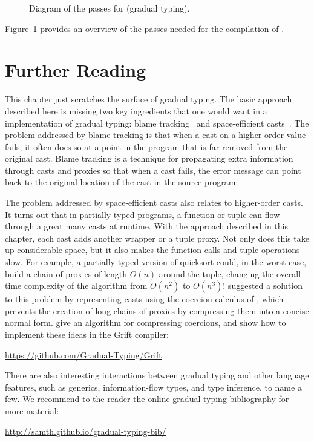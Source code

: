 \documentclass[7x10]{TimesAPriori_MIT}%
\numberwithin{theorem}{chapter}
\numberwithin{definition}{chapter}
\numberwithin{equation}{chapter}
\begin{document}
\begin{figure}[t]
\caption{Diagram of the passes for \LangGrad{} (gradual typing).}
\label{fig:Lgradual-passes}
\end{figure}

Figure~\ref{fig:Lgradual-passes} provides an overview of the passes
needed for the compilation of \LangGrad{}.

\section{Further Reading}

This chapter just scratches the surface of gradual typing.  The basic
approach described here is missing two key ingredients that one would
want in a implementation of gradual typing: blame
tracking~\citep{Tobin-Hochstadt:2006fk,Wadler:2009qv} and
space-efficient casts~\citep{Herman:2006uq,Herman:2010aa}.  The
problem addressed by blame tracking is that when a cast on a
higher-order value fails, it often does so at a point in the program
that is far removed from the original cast. Blame tracking is a
technique for propagating extra information through casts and proxies
so that when a cast fails, the error message can point back to the
original location of the cast in the source program.

The problem addressed by space-efficient casts also relates to
higher-order casts. It turns out that in partially typed programs, a
function or tuple can flow through a great many casts at runtime. With
the approach described in this chapter, each cast adds another
 wrapper or a tuple proxy. Not only does this take up
considerable space, but it also makes the function calls and tuple
operations slow.  For example, a partially typed version of quicksort
could, in the worst case, build a chain of proxies of length $O(n)$
around the tuple, changing the overall time complexity of the
algorithm from $O(n^2)$ to $O(n^3)$! \citet{Herman:2006uq} suggested a
solution to this problem by representing casts using the coercion
calculus of \citet{Henglein:1994nz}, which prevents the creation of
long chains of proxies by compressing them into a concise normal
form. \citet{Siek:2015ab} give an algorithm for compressing coercions,
and \citet{Kuhlenschmidt:2019aa} show how to implement these ideas in
the Grift compiler:
\begin{center}
  \url{https://github.com/Gradual-Typing/Grift}
\end{center}

There are also interesting interactions between gradual typing and
other language features, such as generics, information-flow types, and
type inference, to name a few. We recommend to the reader the
online gradual typing bibliography for more material:
\begin{center}
  \url{http://samth.github.io/gradual-typing-bib/}
\end{center}
\end{document}
